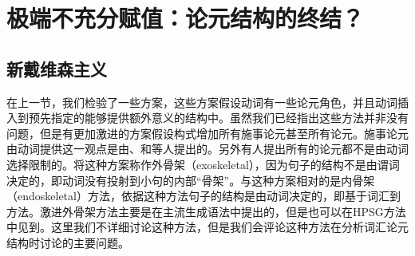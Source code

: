 \section{极端不充分赋值：论元结构的终结？}
\label{radical-sec}

\subsection{新戴维森主义}

\largerpage
在上一节，我们检验了一些方案，这些方案假设动词有一些论元角色，并且动词插入到预先指定的能够提供额外意义的结构中。虽然我们已经指出这些方法并非没有问题，但是有更加激进的方案假设构式增加所有施事论元甚至所有论元。施事论元由动词提供这一观点是由\citet{Marantz84a, Marantz97a}、\citet{Kratzer96a}和\citet{Embick2004a}等人提出的。另外有人提出所有的论元都不是由动词选择限制的。\citet{Borer2003a-u}将这种方案称作外骨架（exoskeletal），因为句子的结构不是由谓词决定的，即动词没有投射到小句的内部“骨架”。与这种方案相对的是内骨架（endoskeletal）方法，依据这种方法句子的结构是由动词决定的，即基于词汇到方法。激进外骨架方法主要是在主流生成语法\citep{Borer94a-u,Borer2003a-u,Borer2005a-u,Schein93a-u,HK97a-u,Lohndal2012a}中提出的，但是也可以在HPSG\citep{Haugereid2009a}方法中见到。这里我们不详细讨论这种方法，但是我们会评论这种方法在分析词汇论元结构时讨论的主要问题。
